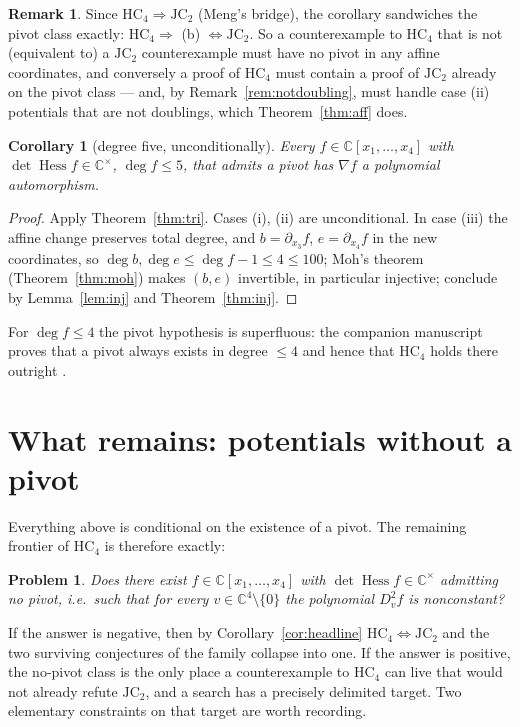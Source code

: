 \documentclass[11pt]{article}
\theoremstyle{plain}
\newtheorem{corollary}[theorem]{Corollary}
\newtheorem{problem}[theorem]{Problem}
\theoremstyle{definition}
\newtheorem{remark}[theorem]{Remark}
\newcommand{\C}{\mathbb{C}}
\newcommand{\Hess}{\operatorname{Hess}}
\newcommand{\HC}{\mathrm{HC}}
\newcommand{\JC}{\mathrm{JC}}
\begin{document}
\begin{remark}\label{rem:sandwich}
Since $\HC_4\Rightarrow\JC_2$ (Meng's bridge), the corollary sandwiches
the pivot class exactly: $\HC_4\Rightarrow$ (b) $\Leftrightarrow\JC_2$.
So a counterexample to $\HC_4$ that is not (equivalent to) a $\JC_2$
counterexample must have no pivot in any affine coordinates, and
conversely a proof of $\HC_4$ must contain a proof of $\JC_2$ already on
the pivot class --- and, by Remark~\ref{rem:notdoubling}, must handle
case (ii) potentials that are not doublings, which
Theorem~\ref{thm:aff} does.
\end{remark}

\begin{corollary}[degree five, unconditionally]\label{cor:deg5}
Every $f\in\C[x_1,\dots,x_4]$ with $\det\Hess f\in\C^{\times}$,
$\deg f\le5$, that admits a pivot has $\nabla f$ a polynomial
automorphism.
\end{corollary}

\begin{proof}
Apply Theorem~\ref{thm:tri}. Cases (i), (ii) are unconditional. In case
(iii) the affine change preserves total degree, and
$b=\partial_{x_3}f$, $e=\partial_{x_4}f$ in the new coordinates, so
$\deg b,\deg e\le\deg f-1\le4\le100$; Moh's theorem
(Theorem~\ref{thm:moh}) makes $(b,e)$ invertible, in particular
injective; conclude by Lemma~\ref{lem:inj} and Theorem~\ref{thm:inj}.
\end{proof}

For $\deg f\le4$ the pivot hypothesis is superfluous: the companion
manuscript proves that a pivot always exists in degree $\le4$ and hence
that $\HC_4$ holds there outright \cite{companion}.

\section{What remains: potentials without a pivot}\label{sec:remaining}

Everything above is conditional on the existence of a pivot. The
remaining frontier of $\HC_4$ is therefore exactly:

\begin{problem}\label{prob:nopivot}
Does there exist $f\in\C[x_1,\dots,x_4]$ with
$\det\Hess f\in\C^{\times}$ admitting \emph{no} pivot, i.e.\ such that
for every $v\in\C^4\setminus\{0\}$ the polynomial $D_v^2f$ is
nonconstant?
\end{problem}

If the answer is negative, then by Corollary~\ref{cor:headline}
$\HC_4\Leftrightarrow\JC_2$ and the two surviving conjectures of the
family collapse into one. If the answer is positive, the no-pivot class
is the only place a counterexample to $\HC_4$ can live that would not
already refute $\JC_2$, and a search has a precisely delimited target.
Two elementary constraints on that target are worth recording.
\end{document}
